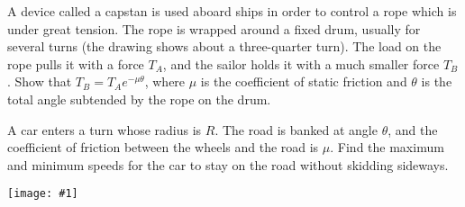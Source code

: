\documentclass[12pt,letterpaper]{hmcpset}
\newcommand{\diagram}[1]{\begin{center}\texttt{[image: \#1]}\end{center}}
\begin{document}
\begin{problem}[2 - Capstan - KK 3.12]
    A device called a capstan is used
    aboard ships in order to control a rope
    which is under great tension. The rope
    is wrapped around a fixed drum, usually
    for several turns (the drawing shows
    about a three-quarter turn). The load on
    the rope pulls it with a force $T_{A}$,
    and the sailor holds it with a much smaller
    force $T_{B}$. Show that $T_{B} = T_{A}e^{-\mu\theta}$,
    where $\mu$ is the coefficient of static friction
    and $\theta$ is the total angle subtended
    by the rope on the drum.

    \begin{center}
    \end{center}
\end{problem}

\begin{solution}
    \vfill
\end{solution}
\newpage

\begin{problem}
    A car enters a turn whose radius is $R$.
    The road is banked at angle $\theta$, and
    the coefficient of friction between the
    wheels and the road is $\mu$. Find the
    maximum and minimum speeds for the car to
    stay on the road without skidding sideways.

    \diagram{img/3_17.png}
\end{problem}
\end{document}
